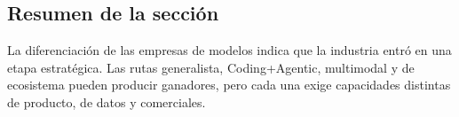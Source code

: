 \subsection{Resumen de la sección}

La diferenciación de las empresas de modelos indica que la industria entró en una etapa estratégica. Las rutas generalista, Coding+Agentic, multimodal y de ecosistema pueden producir ganadores, pero cada una exige capacidades distintas de producto, de datos y comerciales.
